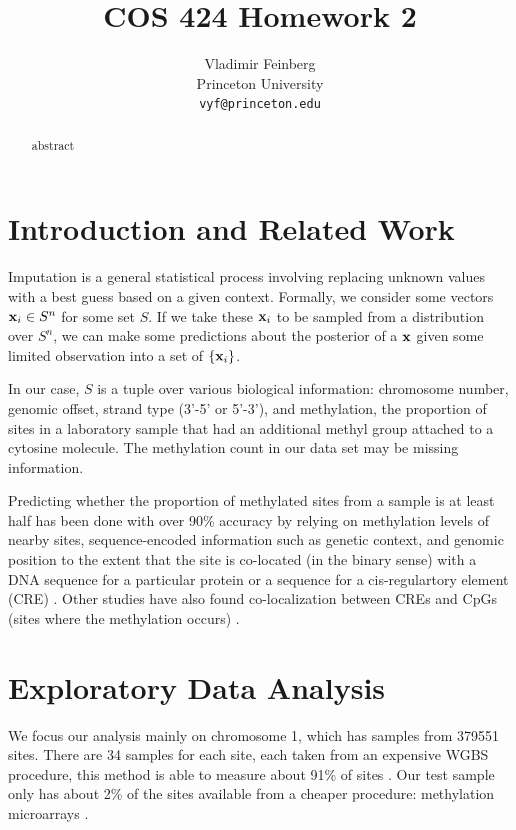 \documentclass{article} %
\title{COS 424 Homework 2}
\author{
Vladimir Feinberg\\
Princeton University\\
\texttt{vyf@princeton.edu}
}
\begin{document}
\maketitle

\begin{abstract}
abstract
\end{abstract}

\section{Introduction and Related Work}

Imputation is a general statistical process involving replacing unknown values with a best guess based on a given context. Formally, we consider some vectors $\textbf{x}_i\in S^n$ for some set $S$. If we take these $\textbf{x}_i$ to be sampled from a distribution over $S^n$, we can make some predictions about the posterior of a $\textbf{x}$ given some limited observation into a set of $\{\textbf{x}_i\}$.

In our case, $S$ is a tuple over various biological information: chromosome number, genomic offset, strand type (3'-5' or 5'-3'), and methylation, the proportion of sites in a laboratory sample that had an additional methyl group attached to a cytosine molecule. The methylation count in our data set may be missing information.

Predicting whether the proportion of methylated sites from a sample is at least half has been done with over 90\% accuracy by relying on methylation levels of nearby sites, sequence-encoded information such as genetic context, and genomic position to the extent that the site is co-located (in the binary sense) with a DNA sequence for a particular protein or a sequence for a cis-regulartory element (CRE) \cite{zhang2015predicting}. Other studies have also found co-localization between CREs and CpGs (sites where the methylation occurs) \cite{ziller2013charting}.

\section{Exploratory Data Analysis}

We focus our analysis mainly on chromosome 1, which has samples from 379551 sites. There are 34 samples for each site, each taken from an expensive WGBS procedure, this method is able to measure about 91\% of sites \cite{laird2010principles}. Our test sample only has about 2\% of the sites available from a cheaper procedure: methylation microarrays \cite{zhang2015predicting}.
\end{document}
